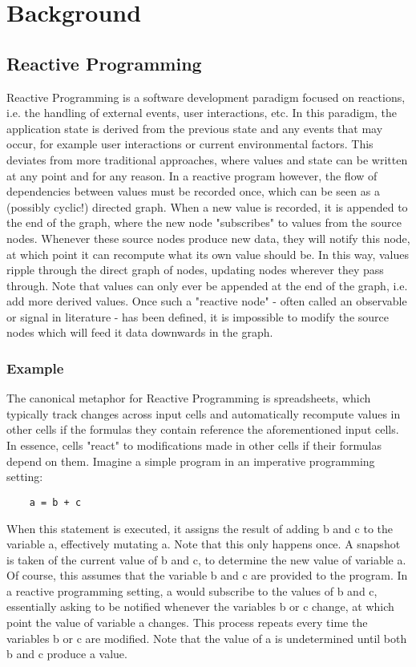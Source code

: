 
\chapter{Background}

\section{Reactive Programming}

Reactive Programming is a software development paradigm focused on reactions, i.e. the handling of external events, user interactions, etc.  In this paradigm, the application state is derived from the previous state and any events that may occur, for example user interactions or current environmental factors. This deviates from more traditional approaches, where values and state can be written at any point and for any reason. In a reactive program however, the flow of dependencies between values must be recorded once, which can be seen as a (possibly cyclic!) directed graph. When a new value is recorded, it is appended to the end of the graph, where the new node "subscribes" to values from the source nodes.
Whenever these source nodes produce new data, they will notify this node, at which point it can recompute what its own value should be. In this way, values ripple through the direct graph of nodes, updating nodes wherever they pass through. Note that values can only ever be appended at the end of the graph, i.e. add more derived values. Once such a "reactive node" - often called an observable or signal in literature - has been defined, it is impossible to modify the source nodes which will feed it data downwards in the graph. 

\subsection{Example}

The canonical metaphor for Reactive Programming is spreadsheets, which typically track changes across input cells and automatically recompute values in other cells if the formulas they contain reference the aforementioned input cells. In essence, cells "react" to modifications made in other cells if their formulas depend on them.
Imagine a simple program in an imperative programming setting:

\begin{lstlisting}
	a = b + c
\end{lstlisting}

When this statement is executed, it assigns the result of adding b and c to the variable a, effectively mutating a. Note that this only happens once. A snapshot is taken of the current value of b and c, to determine the new value of variable a. Of course, this assumes that the variable b and c are provided to the program.
\newline
In a reactive programming setting, a would subscribe to the values of b and c, essentially asking to be notified whenever the variables b or c change, at which point the value of variable a changes. This process repeats every time the variables b or c are modified. Note that the value of a is undetermined until both b and c produce a value. 

